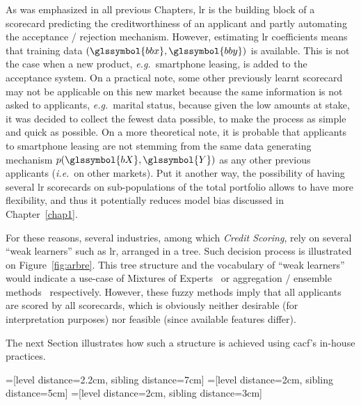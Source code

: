 As was emphasized in all previous Chapters, \gls{lr} is the building block of a scorecard predicting the creditworthiness of an applicant and partly automating the acceptance / rejection mechanism. However, estimating \gls{lr} coefficients means that training data $(\glssymbol{bbx},\glssymbol{bby})$ is available. This is not the case when a new product, \textit{e.g.}\ smartphone leasing, is added to the acceptance system. On a practical note, some other previously learnt scorecard may not be applicable on this new market because the same information is not asked to applicants, \textit{e.g.}\ marital status, because given the low amounts at stake, it was decided to collect the fewest data possible, to make the process as simple and quick as possible. On a more theoretical note, it is probable that applicants to smartphone leasing are not stemming from the same data generating mechanism $p(\glssymbol{bX},\glssymbol{Y})$ as any other previous applicants (\textit{i.e.}\ on other markets). Put it another way, the possibility of having several \gls{lr} scorecards on sub-populations of the total portfolio allows to have more flexibility, and thus it potentially reduces model bias discussed in Chapter~\ref{chap1}.

For these reasons, several industries, among which \textit{Credit Scoring}, rely on several ``weak learners'' such as \gls{lr}, arranged in a tree. Such decision process is illustrated on Figure~\ref{fig:arbre}. This tree structure and the vocabulary of ``weak learners'' would indicate a use-case of Mixtures of Experts~\cite{jordan1994hierarchical} or aggregation / ensemble methods~\cite{opitz1999popular} respectively. However, these fuzzy methods imply that all applicants are scored by all scorecards, which is obviously neither desirable (for interpretation purposes) nor feasible (since available features differ).

The next Section illustrates how such a structure is achieved using \gls{cacf}'s in-house practices.

=[level distance=2.2cm, sibling distance=7cm]
=[level distance=2cm, sibling distance=5cm]
=[level distance=2cm, sibling distance=3cm]

